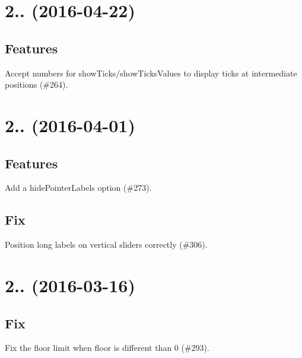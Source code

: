 \section*{2.. (2016-\/04-\/22)}

\subsection*{Features}


\begin{DoxyItemize}
\item Accept numbers for show\+Ticks/show\+Ticks\+Values to display ticks at intermediate positions (\#264).
\end{DoxyItemize}

\section*{2.. (2016-\/04-\/01)}

\subsection*{Features}


\begin{DoxyItemize}
\item Add a hide\+Pointer\+Labels option (\#273).
\end{DoxyItemize}

\subsection*{Fix}


\begin{DoxyItemize}
\item Position long labels on vertical sliders correctly (\#306).
\end{DoxyItemize}

\section*{2.. (2016-\/03-\/16)}

\subsection*{Fix}


\begin{DoxyItemize}
\item Fix the floor limit when floor is different than 0 (\#293).
\end{DoxyItemize}

